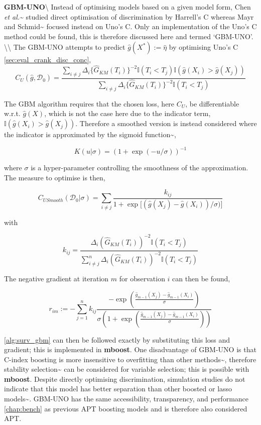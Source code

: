 \documentclass[
  letterpaper,
]{scrbook}
\theoremstyle{plain}
\theoremstyle{definition}
\theoremstyle{remark}
\begin{document}
\textbf{GBM-UNO}\label{mod:gbmuno}\textbackslash{} Instead of optimising
models based on a given model form, Chen
\textit{et al.}\textasciitilde{}\cite{Chen2013} studied direct
optimisation of discrimination by Harrell's C whereas Mayr and
Schmid\textasciitilde{}\cite{Mayr2014} focused instead on Uno's C. Only
an implementation of the Uno's C method could be found, this is
therefore discussed here and termed `GBM-UNO'.
\textbackslash\textbackslash{} The GBM-UNO attempts to predict
\(\hat{g}(X^*) := \hat{\eta}\) by optimising Uno's C
\ref{sec:eval_crank_disc_conc}, \[
C_U(\hat{g}, \mathcal{D}_0) = \frac{\sum_{i \neq j}\Delta_i\{\hat{G}_{KM}(T_i)\}^{-2}\mathbb{I}(T_i < T_j)\mathbb{I}(\hat{g}(X_i) >\hat{g}(X_j))}{\sum_{i \neq j}\Delta_i\{\hat{G}_{KM}(T_i)\}^{-2}\mathbb{I}(T_i < T_j)}
\]

The GBM algorithm requires that the chosen loss, here \(C_U\), be
differentiable w.r.t. \(\hat{g}(X)\), which is not the case here due to
the indicator term, \(\mathbb{I}(\hat{g}(X_i) > \hat{g}(X_j))\).
Therefore a smoothed version is instead considered where the indicator
is approximated by the sigmoid function\textasciitilde{}\cite{Ma2006},

\[
K(u|\sigma) = (1 + \exp(-u/\sigma))^{-1}
\]

where \(\sigma\) is a hyper-parameter controlling the smoothness of the
approximation. The measure to optimise is then,

\[
C_{USmooth}(\mathcal{D}_0|\sigma) = \sum_{i \neq j} \frac{k_{ij}}{1 + \exp\big[(\hat{g}(X_j) - \hat{g}(X_i))/\sigma)\big]}
\label{eq:surv_gbm_cus}
\]

with

\[
k_{ij} = \frac{\Delta_i (\hat{G}_{KM}(T_i))^{-2}\mathbb{I}(T_i < T_j)}{\sum^n_{i \neq j} \Delta_i(\hat{G}_{KM}(T_i))^{-2}\mathbb{I}(T_i < T_j)}
\]

The negative gradient at iteration \(m\) for observation \(i\) can then
be found,

\[
r_{im} := - \sum^n_{j = 1} k_{ij} \frac{-\exp(\frac{\hat{g}_{m-1}(X_j) - \hat{g}_{m-1}(X_i)}{\sigma})}{\sigma(1 + \exp(\frac{\hat{g}_{m-1}(X_j) - \hat{g}_{m-1}(X_i)}{\sigma}))}
\label{eq:surv_gbm_cus_grad}
\]

\ref{alg:surv_gbm} can then be followed exactly by substituting this
loss and gradient; this is implemented in \textbf{mboost}. One
disadvantage of GBM-UNO is that C-index boosting is more insensitive to
overfitting than other methods\textasciitilde{}\cite{Mayr2016},
therefore stability selection\textasciitilde{}\cite{Meinshausen2010} can
be considered for variable selection; this is possible with
\textbf{mboost}. Despite directly optimising discrimination, simulation
studies do not indicate that this model has better separation than other
boosted or lasso models\textasciitilde{}\cite{Mayr2014}. GBM-UNO has the
same accessibility, transparency, and performance \ref{chap:bench} as
previous APT boosting models and is therefore also considered APT.
\end{document}
